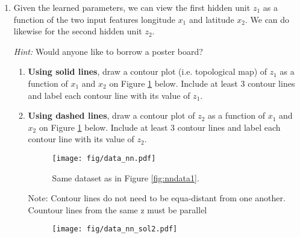 \begin{enumerate}
\newpage
\item Given the learned parameters, we can view the first hidden unit $z_1$ as a function of the two input features longitude $x_1$ and latitude $x_2$. We can do likewise for the second hidden unit $z_2$. 

\emph{Hint:} Would anyone like to borrow a poster board?

\begin{enumerate}[label=\roman*)]

    \item {} \textbf{Using solid lines}, draw a contour plot (i.e. topological map) of $z_1$ as a function of $x_1$ and $x_2$ on Figure \ref{fig:nndata2} below. Include at least 3 contour lines and label each contour line with its value of $z_1$. 
    \item {} \textbf{Using dashed lines}, draw a contour plot of $z_2$ as a function of $x_1$ and $x_2$ on Figure \ref{fig:nndata2} below. Include at least 3 contour lines and label each contour line with its value of $z_2$.
    \begin{figure}[H]
    \centering
    \texttt{[image: fig/data\_nn.pdf]}
    \caption{Same dataset as in Figure \ref{fig:nndata1}.}
    \label{fig:nndata2}
    \end{figure}
    
    
\begin{soln}

Note: Contour lines do not need to be equa-distant from one another.  Countour lines from the same z must be parallel

\begin{figure}[H]
    \centering
    \texttt{[image: fig/data\_nn\_sol2.pdf]}
\end{figure}
\end{soln}
    

    
    
\end{enumerate}


\end{enumerate}
